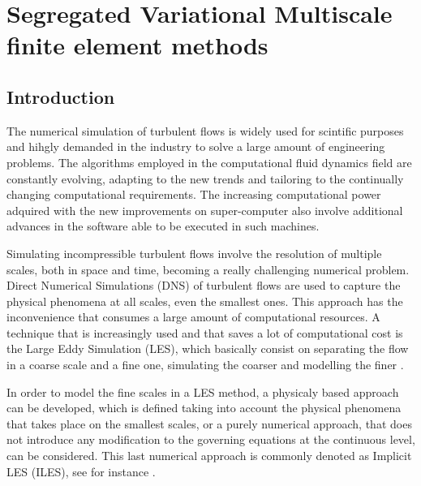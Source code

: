 \chapter{Segregated Variational Multiscale finite element methods}
\label{chap-SVMS}

\section{Introduction}
\label{sec-C7_intro}

The numerical simulation of turbulent flows is widely used for scintific purposes and hihgly demanded in the industry to solve a large amount of engineering problems. The algorithms employed in the computational fluid dynamics field are constantly evolving, adapting to the new trends and tailoring to the continually changing computational requirements. The increasing computational power adquired with the new improvements on super-computer also involve additional advances in the software able to be executed in such machines.

Simulating incompressible turbulent flows involve the resolution of multiple scales, both in space and time, becoming a really challenging numerical problem. Direct Numerical Simulations (DNS) of turbulent flows are used to capture the physical phenomena at all scales, even the smallest ones. This approach has the inconvenience that consumes a large amount of computational resources. A technique that is increasingly used and that saves a lot of computational cost is the Large Eddy Simulation (LES), which basically consist on separating the flow in a coarse scale and a fine one, simulating the coarser and modelling the finer \cite{sagaut_large_2000}. 

In order to model the fine scales in a LES method, a physicaly based approach can be developed, which is defined taking into account the physical phenomena that takes place on the smallest scales, or a purely numerical approach, that does not introduce any modification to the governing equations at the continuous level, can be considered. This last numerical approach is commonly denoted as Implicit LES (ILES), see for instance \cite{boris_new_1992}.

